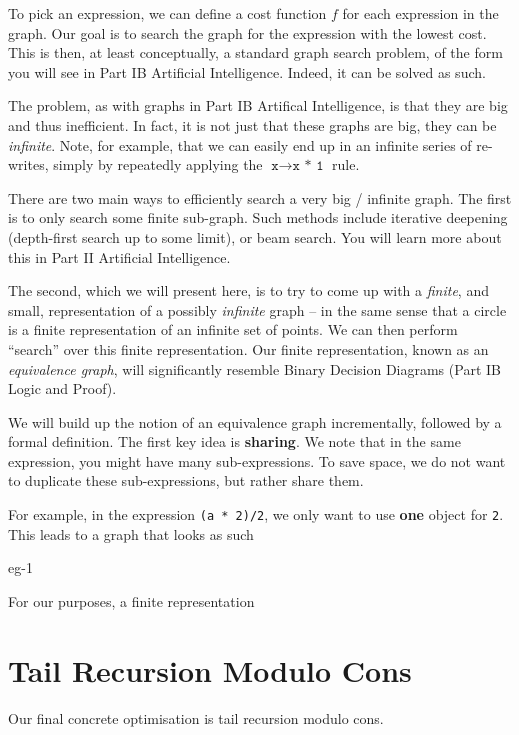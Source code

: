 To pick an expression, we can define a cost function $f$ for each expression in the graph. Our goal is to search the graph for the expression with the lowest cost. This is then, at least conceptually, a standard graph search problem, of the form you will see in \textsf{Part IB Artificial Intelligence}. Indeed, it can be solved as such. 

The problem, as with graphs in \textsf{Part IB Artifical Intelligence}, is that they are big and thus inefficient. In fact, it is not just that these graphs are big, they can be \textit{infinite}. Note, for example, that we can easily end up in an infinite series of re-writes, simply by repeatedly applying the $\texttt{x} \to \texttt{x * 1}$ rule. 

There are two main ways to efficiently search a very big / infinite graph. The first is to only search some finite sub-graph. Such methods include iterative deepening (depth-first search up to some limit), or beam search. You will learn more about this in \textsf{Part II Artificial Intelligence}.

The second, which we will present here, is to try to come up with a \textit{finite}, and small, representation of a possibly \textit{infinite} graph -- in the same sense that a circle is a finite representation of an infinite set of points. We can then perform ``search'' over this finite representation. Our finite representation, known as an \textit{equivalence graph}, will significantly resemble Binary Decision Diagrams (\textsf{Part IB Logic and Proof}). 

We will build up the notion of an equivalence graph incrementally, followed by a formal definition. The first key idea is \textbf{sharing}. We note that in the same expression, you might have many sub-expressions. To save space, we do not want to duplicate these sub-expressions, but rather share them. 

For example, in the expression \texttt{(a * 2)/2}, we only want to use \textbf{one} object for \texttt{2}. This leads to a graph that looks as such


\begin{center}
    {eg-1}
\end{center}

For our purposes, a finite representation 

\section{Tail Recursion Modulo Cons}
Our final concrete optimisation is tail recursion modulo cons. 

